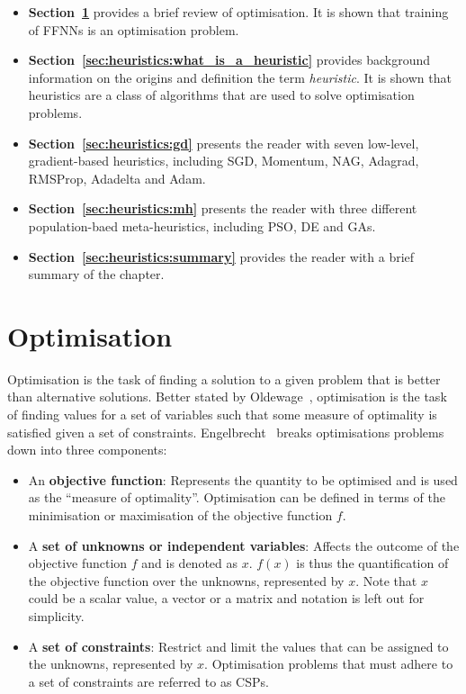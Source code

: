 \begin{itemize}
      \item \textbf{Section~\ref{sec:heuristics:optimisation}} provides a brief review of optimisation. It is shown that training of \acp{FFNN} is an optimisation problem.

      \item \textbf{Section~\ref{sec:heuristics:what_is_a_heuristic}} provides background information on the origins and definition the term \textit{heuristic}. It is shown that heuristics are a class of algorithms that are used to solve optimisation problems.

      \item \textbf{Section~\ref{sec:heuristics:gd}} presents the reader with seven low-level, gradient-based heuristics, including \acf{SGD}, \acf{Momentum}, \acf{NAG}, \acf{Adagrad}, \acf{RMSProp}, \acf{Adadelta} and \acf{Adam}.

      \item \textbf{Section~\ref{sec:heuristics:mh}} presents the reader with three different population-baed meta-heuristics, including \acf{PSO}, \acf{DE} and \acfp{GA}.

      \item \textbf{Section~\ref{sec:heuristics:summary}} provides the reader with a brief summary of the chapter.
\end{itemize}

\section{Optimisation}\label{sec:heuristics:optimisation}

Optimisation is the task of finding a solution to a given problem that is better than alternative solutions. Better stated by Oldewage~\cite{ref:oldewage:2017}, optimisation is the task of finding values for a set of variables such that some measure of optimality is satisfied given a set of constraints. Engelbrecht~\cite{ref:engelbrecht:2007} breaks optimisations problems down into three components:

\begin{itemize}
      \item An \textbf{objective function}: Represents the quantity to be optimised and is used as the ``measure of optimality''. Optimisation can be defined in terms of the minimisation or maximisation of the objective function $f$.

      \item A \textbf{set of unknowns or independent variables}: Affects the outcome of the objective function $f$ and is denoted as $x$. $f(x)$ is thus the quantification of the objective function over the unknowns, represented by $x$. Note that $x$ could be a scalar value, a vector or a matrix and notation is left out for simplicity.

      \item A \textbf{set of constraints}: Restrict and limit the values that can be assigned to the unknowns, represented by $x$. Optimisation problems that must adhere to a set of constraints are referred to as \acfp{CSP}.
\end{itemize}

